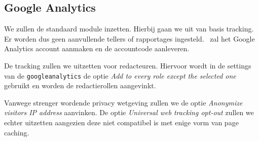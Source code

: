 \subsection{Google Analytics}\label{analytics}

We zullen de standaard  module inzetten. Hierbij gaan we uit van basis tracking. Er worden dus geen aanvullende tellers of rapportages ingesteld. \thecustomer \ zal het Google Analytics account aanmaken en de accountcode aanleveren.

De tracking zullen we uitzetten voor redacteuren. Hiervoor wordt in de settings van de \texttt{googleanalytics} de optie \emph{Add to every role except the selected one} gebruikt en worden de redactierollen aangevinkt.

Vanwege strenger wordende privacy wetgeving zullen we de optie \emph{Anonymize visitors IP address} aanvinken. De optie \emph{Universal web tracking opt-out} zullen we echter uitzetten aangezien deze niet compatibel is met enige vorm van page caching.
